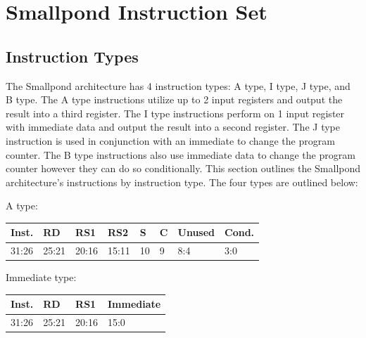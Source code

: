 \documentclass[12pt]{article}
\begin{document}
\newpage
\section{Smallpond Instruction Set}

\subsection{Instruction Types}
    The Smallpond architecture has 4 instruction types: A type, I type, J type, and B type. The A type instructions utilize up to 2 input registers and output the result into a third register. The I type instructions perform on 1 input register with immediate data and output the result into a second register. The J type instruction is used in conjunction with an immediate to change the program counter. The B type instructions also use immediate data to change the program counter however they can do so conditionally. This section outlines the Smallpond architecture's instructions by instruction type. The four types are outlined below:\\

    \begin{center}
        A type:\\
        \vspace{1em}
        \begin{tabular}{ |p{1.8cm}|p{1.5cm}|p{1.5cm}|p{1.5cm}|p{0.3cm}|p{0.3cm}|p{1.5cm}|p{1.5cm}| }
            \hline
            \textbf{Inst.} & \textbf{RD}& \textbf{RS1} & \textbf{RS2} & \textbf{S} & \textbf{C} & Unused & \textbf{Cond.}\\
            \hline
            31:26& 25:21 & 20:16 & 15:11 & 10 & 9 & 8:4 &3:0\\
            \hline
        \end{tabular}
    \end{center}
    
    \begin{center}
        Immediate type:\\
        \vspace{1em}
        \begin{tabular}{ |p{1.8cm}|p{1.5cm}|p{1.5cm}|p{6.8cm}| }
            \hline
            \textbf{Inst.} & \textbf{RD} &  \textbf{RS1} & \textbf{Immediate}\\
            \hline
            31:26& 25:21 & 20:16 &15:0\\
            \hline
        \end{tabular}
    \end{center}
    
\end{document}
